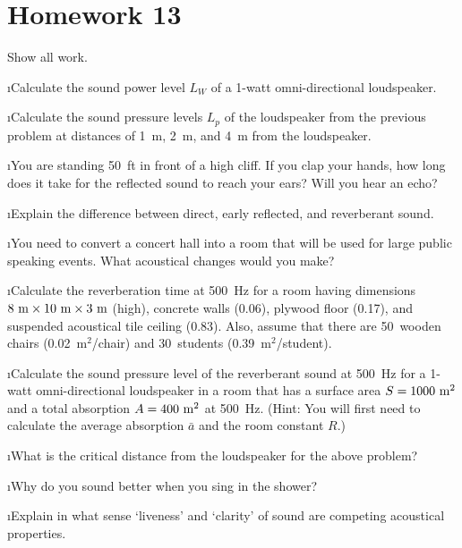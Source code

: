 \section{Homework 13}

\noindent
Show all work.

\ben

\i Calculate the sound power level $L_W$ of a 1-watt 
omni-directional loudspeaker.

\i Calculate the sound pressure levels $L_p$ of the 
loudspeaker from the previous problem at distances
of 1~m, 2~m, and 4~m from the loudspeaker.

\i You are standing 50~ft in front of a high cliff.
If you clap your hands, how long does it take for 
the reflected sound to reach your ears?
Will you hear an echo?

\i Explain the difference between direct, early 
reflected, and reverberant sound.

\i You need to convert a concert hall into a room
that will be used for large public speaking events.
What acoustical changes would you make?

\i Calculate the reverberation time at 500~Hz for a room 
having dimensions $8~{\rm m}\times 10~{\rm m}\times 3~{\rm m}$ (high),
concrete walls (0.06), plywood floor (0.17), and suspended
acoustical tile ceiling (0.83).
Also, assume that there are 50~wooden chairs (0.02~m${}^2$/chair)
and 30~students (0.39~m${}^2$/student).

\i Calculate the sound pressure level of the reverberant
sound at 500~Hz for a 1-watt omni-directional loudspeaker in a room that
has a surface area $S=1000~{\rm m}^2$ and a total absorption
$A=400~{\rm m}^2$ at 500~Hz.
(Hint: You will first need to calculate the average 
absorption $\bar a$ and the room constant $R$.)

\i What is the critical distance from the loudspeaker 
for the above problem?
 
\i Why do you sound better when you sing in the shower?

\i Explain in what sense `liveness' and `clarity' of sound
are competing acoustical properties.

\een

